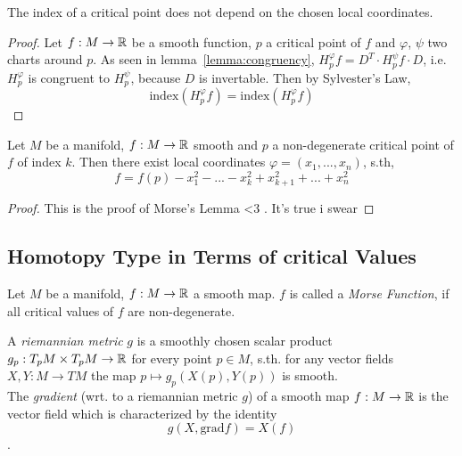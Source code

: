 \documentclass[a4paper,11pt]{article}
\begin{document}
\begin{lemma}
   \label{lemma:index}
   The index of a critical point does not depend on the chosen local coordinates.
\end{lemma}

\begin{proof}
   Let $f: M \rightarrow {\mathbb R}$ be a smooth function, $p$ a critical point of $f$
   and $\varphi$, $\psi$ two charts around $p$.
   As seen in lemma~\ref{lemma:congruency}, $H_p^{\varphi}f = D^T \cdot H_p^{\psi}f \cdot D$, i.e.
   $H_p^{\varphi}$ is congruent to $H_p^{\psi}$, because $D$ is invertable. Then by Sylvester's Law, 
   \[ \text{{index}}(H_p^{\varphi}f) = \text{{index}}(H_p^{\varphi}f) \]
\end{proof}

\begin{theorem}
   \label{theorem:morse lemma}

   Let $M$ be a manifold, $f: M \rightarrow {\mathbb R}$ smooth and $p$ a non-degenerate 
   critical point of $f$ of index $k$. Then there exist local coordinates $\varphi = (x_1, ..., x_n)$, s.th,
   \[ f = f(p) - x_1^2 - ... - x_k^2 + x_{k+1}^2 + ... + x_n^2 \]
\end{theorem}

\begin{proof}
   This is the proof of Morse's Lemma <3 . It's true i swear
\end{proof}

\subsection{Homotopy Type in Terms of critical Values}

\begin{definition}
   \label{def:morse function}

   Let $M$ be a manifold, $f:M \rightarrow {\mathbb R}$ a smooth map. $f$ is called a \textit{Morse Function},
   if all critical values of $f$ are non-degenerate.   
\end{definition}

\begin{definition}
   \label{def:riemannian metric, grad}
   A \textit{riemannian metric} $g$ is a smoothly chosen scalar product $g_p: T_pM \times T_pM \rightarrow {\mathbb R}$
   for every point $p \in M$, s.th. for any vector fields $ X, Y: M \rightarrow TM $ the map 
   $ p \mapsto g_p(X(p), Y(p)) $ is smooth. \\
   The \textit{gradient} (wrt. to a riemannian metric $g$) of a smooth map $f: M \rightarrow {\mathbb R}$ is the vector field
   which is characterized by the identity 
   \[ g(X, \text{grad} f) = X(f) \] .
\end{definition}
\end{document}
